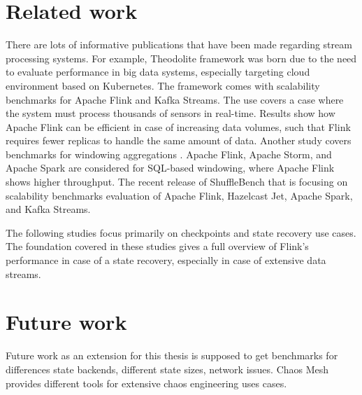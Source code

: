 \section{Related work}\label{sec:interpretation-of-results}
There are lots of informative publications that have been made
regarding stream processing systems.
For example, Theodolite framework \cite{theodolite_framework} was born
due to the need to evaluate performance in big data systems, especially
targeting cloud environment based on Kubernetes.
The framework comes with scalability benchmarks for Apache Flink and Kafka Streams.
The use covers a case where the system must process thousands of sensors in
real-time.
Results show how Apache Flink can be efficient in case of increasing data volumes,
such that Flink requires fewer replicas to handle the same amount of data.
Another study covers benchmarks for windowing aggregations \cite{dataSystemBenchmarks}.
Apache Flink, Apache Storm, and Apache Spark are considered for SQL-based windowing, where Apache Flink shows higher throughput.
The recent release of ShuffleBench \cite{Henning_2024} that is focusing on scalability
benchmarks evaluation of Apache Flink, Hazelcast Jet, Apache Spark, and Kafka Streams.

The following studies \cite{carbone2015lightweight} \cite{siachamis2024checkmate} focus
primarily on checkpoints and state recovery use cases.
The foundation covered in these studies gives a full overview of Flink's performance in
case of a state recovery, especially in case of extensive data streams.

\section{Future work}\label{sec:future-work}
Future work as an extension for this thesis is supposed to get benchmarks
for differences state backends, different state sizes, network issues.
Chaos Mesh \cite{chaosMesh} provides different tools for extensive chaos engineering
uses cases.
